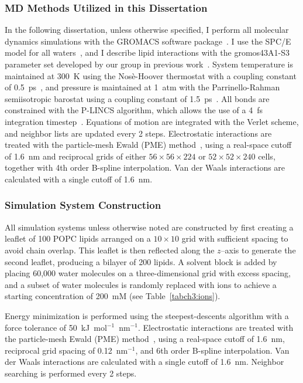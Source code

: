 \subsubsection{MD Methods Utilized in this Dissertation}
In the following dissertation, unless otherwise specified, I perform all molecular dynamics simulations with the GROMACS software 
package~\cite{abraham:2015,pall:2014,van:2005,lindahl:2001,berendsen:1995,gromacs}.
I use the SPC/E model for all waters~\cite{spce}, and I describe lipid interactions
with the gromos43A1-S3 parameter set developed by our group in previous work~\cite{chiu:2009}.
System temperature is maintained at 300~K using the Nos\`e-Hoover thermostat
with a coupling constant of 0.5~ps~\cite{nose:1983}, and pressure is maintained
at 1~atm with the Parrinello-Rahman semiisotropic barostat using a coupling constant of 1.5~ps~\cite{parrinello:1981}.
All bonds are constrained with the P-LINCS algorithm, which allows the use of a 4~fs integration timestep~\cite{lincs}.
Equations of motion are integrated with the Verlet scheme, and neighbor lists are updated every 2 steps.
Electrostatic interactions are treated with the particle-mesh Ewald (PME) method~\cite{essmann:1995},
using a real-space cutoff of 1.6~nm and reciprocal grids of either
$56 \times 56 \times 224$ or $52 \times 52 \times 240$ cells,
together with 4th order B-spline interpolation.
Van der Waals interactions are calculated with a single cutoff of 1.6~nm.
\subsubsection{Simulation System Construction}
All simulation systems unless otherwise noted are constructed by first creating a leaflet of 100 POPC lipids arranged
on a $10 \times 10$ grid with sufficient spacing to avoid chain overlap.
This leaflet is then reflected along the $z$--axis to generate the second
leaflet, producing a bilayer of 200 lipids. A solvent block is added by
placing 60,000 water molecules on a three-dimensional grid with excess spacing,
and a subset of water molecules is randomly replaced with ions to achieve a
starting concentration of 200~mM (see Table~\ref{tabch3:ions}).

Energy minimization is performed using the steepest-descents algorithm with a
force tolerance of 50~kJ~mol$^{-1}$~nm$^{-1}$. Electrostatic interactions are
treated with the particle-mesh Ewald (PME) method~\cite{essmann:1995}, using a
real-space cutoff of 1.6~nm, reciprocal grid spacing of 0.12~nm$^{-1}$, and
6th order B-spline interpolation. Van der Waals interactions are calculated
with a single cutoff of 1.6~nm. Neighbor searching is performed every 2 steps.

